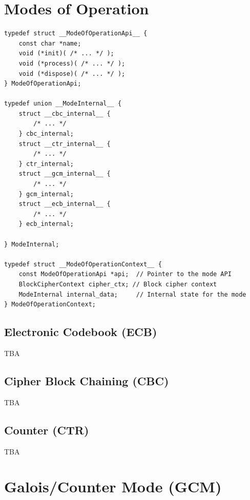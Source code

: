 \documentclass[11pt,a4paper]{report}
\theoremstyle{definitionstyle}
\begin{document}
\newpage
\section{Modes of Operation}

\begin{lstlisting}[style=cstyle]
typedef struct __ModeOfOperationApi__ {
	const char *name;
	void (*init)( /* ... */ );
	void (*process)( /* ... */ );
	void (*dispose)( /* ... */ );
} ModeOfOperationApi;

typedef union __ModeInternal__ {
	struct __cbc_internal__ {
		/* ... */
	} cbc_internal;
	struct __ctr_internal__ {
		/* ... */
	} ctr_internal;
	struct __gcm_internal__ {
		/* ... */
	} gcm_internal;
	struct __ecb_internal__ {
		/* ... */
	} ecb_internal;
	
} ModeInternal;

typedef struct __ModeOfOperationContext__ {
	const ModeOfOperationApi *api;  // Pointer to the mode API
	BlockCipherContext cipher_ctx; // Block cipher context
	ModeInternal internal_data;     // Internal state for the mode
} ModeOfOperationContext;
\end{lstlisting}
%	

\newpage
\subsection{Electronic Codebook (ECB)}
TBA
\subsection{Cipher Block Chaining (CBC)}
TBA
\subsection{Counter (CTR)}
TBA
\newpage
\section{Galois\;/\;Counter Mode (GCM)}


\newpage
\end{document}
